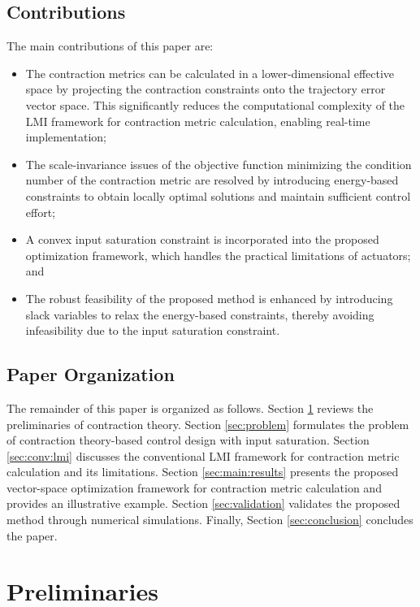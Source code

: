 \documentclass{ifacconf}
\begin{document}
\subsection{Contributions}

The main contributions of this paper are:
\begin{itemize}
   \item The contraction metrics can be calculated in a lower-dimensional effective space by projecting the contraction constraints onto the trajectory error vector space. This significantly reduces the computational complexity of the LMI framework for contraction metric calculation, enabling real-time implementation;
   \item The scale-invariance issues of the objective function minimizing the condition number of the contraction metric are resolved by introducing energy-based constraints to obtain locally optimal solutions and maintain sufficient control effort;
   \item A convex input saturation constraint is incorporated into the proposed optimization framework, which handles the practical limitations of actuators; and
   \item The robust feasibility of the proposed method is enhanced by introducing slack variables to relax the energy-based constraints, thereby avoiding infeasibility due to the input saturation constraint.
\end{itemize}

\subsection{Paper Organization}

The remainder of this paper is organized as follows.
Section \ref{sec:preliminaries} reviews the preliminaries of contraction theory.
Section \ref{sec:problem} formulates the problem of contraction theory-based control design with input saturation.
Section \ref{sec:conv:lmi} discusses the conventional LMI framework for contraction metric calculation and its limitations.
Section \ref{sec:main:results} presents the proposed vector-space optimization framework for contraction metric calculation and provides an illustrative example.
Section \ref{sec:validation} validates the proposed method through numerical simulations.
Finally, Section \ref{sec:conclusion} concludes the paper.

\section{Preliminaries} \label{sec:preliminaries}
\end{document}
